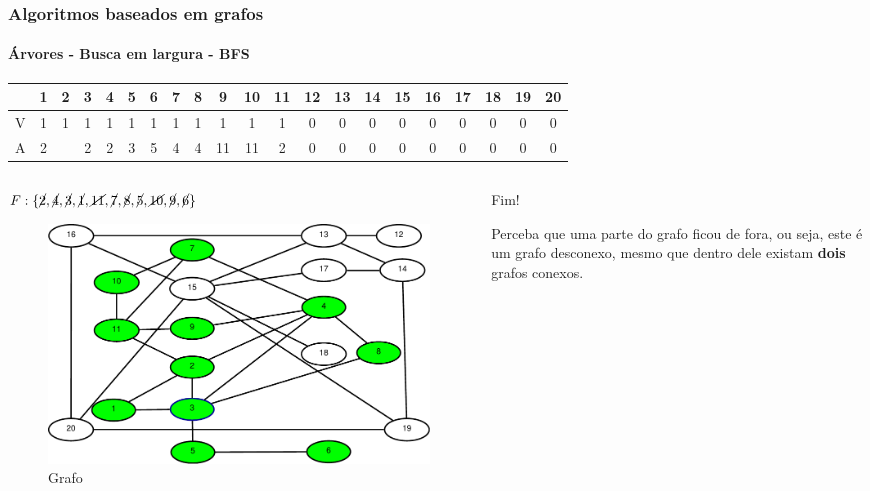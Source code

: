 \begin{frame}
	\frametitle{Algoritmos baseados em grafos}
	\framesubtitle{Árvores - Busca em largura - BFS}
	\setlength{\tabcolsep}{0.5em}
	\begin{tabular}{|c|c|c|c|c|c|c|c|c|c|c|c|c|c|c|c|c|c|c|c|c|}
		\hline
		\rule[0ex]{0pt}{0ex}&1&2&3&4&5&6&7&8&9&10&11&12&13&14&15&16&17&18&19&20 \\
		\hline
		\rule[0ex]{0pt}{0ex}V&1&1&1&1&1&1&1&1&1&1&1&0&0&0&0&0&0&0&0&0 \\
		\hline
		\rule[0ex]{0pt}{0ex}A&2& &2&2&3&5&4&4&11&11&2&0&0&0&0&0&0&0&0&0 \\
		\hline
	\end{tabular}
	\begin{columns}
		\begin{column}{0.5\textwidth}
			\par $F:\{\cancel{2},\cancel{4},\cancel{3},\cancel{1},\cancel{11},\cancel{7},\cancel{8},\cancel{5},\cancel{10},\cancel{9},\cancel{6}\}$
			\begin{figure}
				\centering
				\includegraphics[width=\linewidth]{images/buscaEmLargura11}
				\caption{Grafo}
				\label{fig:buscaemlargura12}
			\end{figure}
		\end{column}
		\pause
		\begin{column}{0.5\textwidth}
			\par Fim!
			\par Perceba que uma parte do grafo ficou de fora, ou seja, este é um grafo desconexo, mesmo que dentro dele existam \textbf{dois} grafos conexos.
		\end{column}
	\end{columns}
\end{frame}

